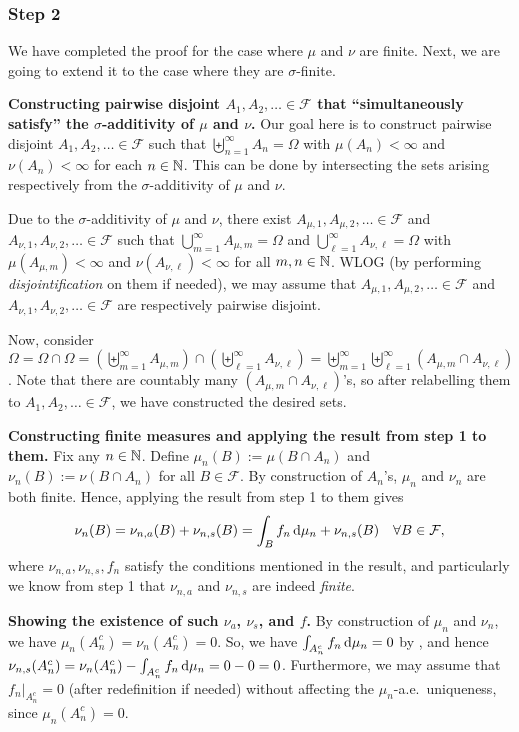 \begin{enumerate}
\begin{pf}
\subsubsection*{Step 2}
We have completed the proof for the case where \(\mu\) and \(\nu\) are finite.
Next, we are going to extend it to the case where they are \(\sigma\)-finite.

\textbf{Constructing pairwise disjoint \(A_1,A_2,\dotsc\in\mathcal{F}\) that ``simultaneously
satisfy'' the \(\sigma\)-additivity of \(\mu\) and \(\nu\).}
Our goal here is to construct pairwise disjoint
\(A_1,A_2,\dotsc\in\mathcal{F}\) such that
\(\biguplus_{n=1}^{\infty}A_n=\Omega\) with \(\mu(A_n)<\infty\) and
\(\nu(A_n)<\infty\) for each \(n\in\mathbb{N}\). This can be done by intersecting the
sets arising respectively from the \(\sigma\)-additivity of \(\mu\) and \(\nu\).

Due to the \(\sigma\)-additivity of \(\mu\) and \(\nu\), there exist
\(A_{\mu,1},A_{\mu,2},\dotsc\in\mathcal{F}\) and \(A_{\nu,1},A_{\nu,2},\dotsc\in\mathcal{F}\)
such that \(\bigcup_{m=1}^{\infty}A_{\mu,m}=\Omega\) and
\(\bigcup_{\ell=1}^{\infty}A_{\nu,\ell}=\Omega\) with \(\mu(A_{\mu,m})<\infty\) and
\(\nu(A_{\nu,\ell})<\infty\) for all \(m,n\in\mathbb{N}\). WLOG (by performing
\emph{disjointification} on them if needed), we may assume that
\(A_{\mu,1},A_{\mu,2},\dotsc\in\mathcal{F}\) and \(A_{\nu,1},A_{\nu,2},\dotsc\in\mathcal{F}\)
are respectively pairwise disjoint.

Now, consider
\(\Omega=\Omega\cap\Omega=(\biguplus_{m=1}^{\infty}A_{\mu,m})\cap(\biguplus_{\ell=1}^{\infty}A_{\nu,\ell})=\biguplus_{m=1}^{\infty}\biguplus_{\ell=1}^{\infty}(A_{\mu,m}\cap
A_{\nu,\ell})\). Note that there are countably many \((A_{\mu,m}\cap
A_{\nu,\ell})\)'s, so after relabelling them to \(A_1,A_2,\dotsc\in\mathcal{F}\), we
have constructed the desired sets.

\textbf{Constructing finite measures and applying the result from step 1 to them.}
Fix any \(n\in\mathbb{N}\). Define \(\mu_n(B):=\mu(B\cap A_n)\) and
\(\nu_n(B):=\nu(B\cap A_n)\) for all \(B\in\mathcal{F}\). By construction of
\(A_n\)'s, \(\mu_n\) and \(\nu_n\) are both finite. Hence, applying the result
from step 1 to them gives
\[
\nu_n(B)=\nu_{n,a}(B)+\nu_{n,s}(B)=\int_{B}^{}f_n\odif{\mu_n}+\nu_{n,s}(B)
\quad\forall B\in\mathcal{F},
\]
where \(\nu_{n,a},\nu_{n,s},f_n\) satisfy the conditions mentioned in the result,
and particularly we know from step 1 that \(\nu_{n,a}\) and \(\nu_{n,s}\) are
indeed \emph{finite}.

\textbf{Showing the existence of such \(\nu_a\), \(\nu_s\), and \(f\).} By
construction of \(\mu_n\) and \(\nu_n\), we have
\(\mu_n(A_n^c)=\nu_n(A_n^c)=0\). So, we have
\(\int_{A_n^c}^{}f_n\odif{\mu_n}=0\) by , and hence
\(\nu_{n,s}(A_n^c)=\nu_n(A_n^c)-\int_{A_n^c}^{}f_n\odif{\mu_n}=0-0=0\).
Furthermore, we may assume that \(f_n|_{A_n^c}=0\) (after redefinition if
needed) without affecting the \(\mu_n\)-a.e.\ uniqueness, since
\(\mu_n(A_n^c)=0\).


\end{pf}
\end{enumerate}
